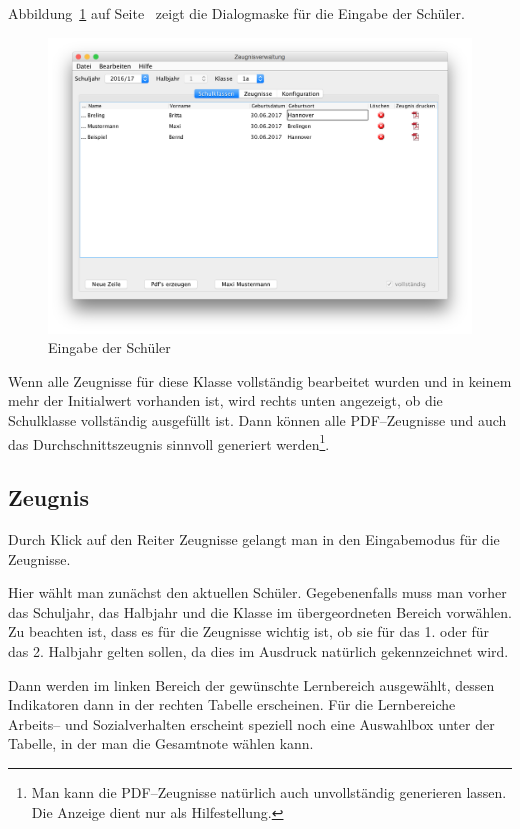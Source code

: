 \documentclass[a4paper,notitlepage,parskip]{scrartcl}
\newcommand\ott{\normalfont\ttfamily}
\begin{document}
Abbildung~\ref{fig:Schulklassen} auf Seite~\pageref{fig:Schulklassen} zeigt die Dialogmaske für die Eingabe der Schüler.

\begin{figure}[ht]
\centering
\centerline{\includegraphics[width=1.0\textwidth]{Schulklassen}}
\caption{Eingabe der Schüler}
\label{fig:Schulklassen}
\end{figure}

Wenn alle Zeugnisse für diese Klasse vollständig bearbeitet wurden und in keinem mehr der Initialwert vorhanden ist, wird rechts unten angezeigt, ob die Schulklasse vollständig ausgefüllt ist.
Dann können alle PDF--Zeugnisse und auch das Durchschnittszeugnis sinnvoll generiert werden\footnote{Man kann die PDF--Zeugnisse natürlich auch unvollständig generieren lassen. Die Anzeige dient nur als Hilfestellung.}.
\subsection{Zeugnis}
Durch Klick auf den Reiter {\ott Zeugnisse} gelangt man in den Eingabemodus für die Zeugnisse.

Hier wählt man zunächst den aktuellen Schüler.
Gegebenenfalls muss man vorher das Schuljahr, das Halbjahr und die Klasse im übergeordneten Bereich vorwählen.
Zu beachten ist, dass es für die Zeugnisse wichtig ist, ob sie für das 1. oder für das 2. Halbjahr gelten sollen,
da dies im Ausdruck natürlich gekennzeichnet wird.

Dann werden im linken Bereich der gewünschte Lernbereich ausgewählt, dessen Indikatoren dann in der rechten Tabelle erscheinen.
Für die Lernbereiche Arbeits-- und Sozialverhalten erscheint speziell noch eine Auswahlbox unter der Tabelle, in der man die Gesamtnote wählen kann. 
\end{document}
